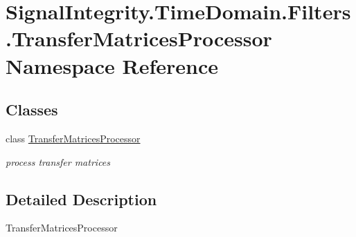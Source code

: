 \hypertarget{namespaceSignalIntegrity_1_1TimeDomain_1_1Filters_1_1TransferMatricesProcessor}{}\section{Signal\+Integrity.\+Time\+Domain.\+Filters.\+Transfer\+Matrices\+Processor Namespace Reference}
\label{namespaceSignalIntegrity_1_1TimeDomain_1_1Filters_1_1TransferMatricesProcessor}
\subsection*{Classes}
\begin{DoxyCompactItemize}
\item 
class \hyperlink{classSignalIntegrity_1_1TimeDomain_1_1Filters_1_1TransferMatricesProcessor_1_1TransferMatricesProcessor}{Transfer\+Matrices\+Processor}
\begin{DoxyCompactList}\small\item\em process transfer matrices \end{DoxyCompactList}\end{DoxyCompactItemize}


\subsection{Detailed Description}
\begin{DoxyVerb}TransferMatricesProcessor\end{DoxyVerb}
 